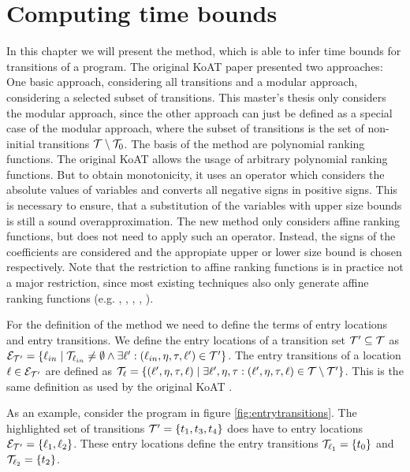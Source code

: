 \section{Computing time bounds}

In this chapter we will present the method, which is able to infer time bounds for transitions of a program.
The original KoAT paper \cite{koat} presented two approaches: One basic approach, considering all transitions and a modular approach, considering a selected subset of transitions.
This master's thesis only considers the modular approach, since the other approach can just be defined as a special case of the modular approach, where the subset of transitions is the set of non-initial transitions $\mathcal{T} \setminus \mathcal{T}_0$.
The basis of the method are polynomial ranking functions.
The original KoAT allows the usage of arbitrary polynomial ranking functions.
But to obtain monotonicity, it uses an operator which considers the absolute values of variables and converts all negative signs in positive signs.
This is necessary to ensure, that a substitution of the variables with upper size bounds is still a sound overapproximation.
The new method only considers affine ranking functions, but does not need to apply such an operator.
Instead, the signs of the coefficients are considered and the appropiate upper or lower size bound is chosen respectively.
Note that the restriction to affine ranking functions is in practice not a major restriction, since most existing techniques also only generate affine ranking functions (e.g. \cite{podelski2004prf}, \cite{bradley2005linear}, \cite{bagnara2012new}, \cite{leike2014ranking}, \cite{ben2013linear}).

For the definition of the method we need to define the terms of entry locations and entry transitions.
We define the entry locations of a transition set $\mathcal{T}' \subseteq \mathcal{T}$ as $\mathcal{E}_{\mathcal{T}'} = \lbrace \ell_{in} \mid \mathcal{T}_{\ell_{in}} \neq \emptyset \wedge \exists \ell': (\ell_{in}, \eta, \tau, \ell') \in \mathcal{T}' \rbrace$.
The entry transitions of a location $\ell \in \mathcal{E}_{\mathcal{T}'}$ are defined as $\mathcal{T}_{\ell} = \lbrace (\ell', \eta, \tau, \ell) \mid \exists \ell', \eta, \tau: (\ell', \eta, \tau, \ell) \in \mathcal{T} \setminus \mathcal{T}' \rbrace$.
This is the same definition as used by the original KoAT \cite{koat}.



As an example, consider the program in figure \ref{fig:entrytransitions}.
The highlighted set of transitions $\mathcal{T}' = \lbrace t_1, t_3, t_4 \rbrace$ does have to entry locations $\mathcal{E}_{\mathcal{T}'} = \lbrace \ell_1, \ell_2 \rbrace$.
These entry locations define the entry transitions $\mathcal{T}_{\ell_1} = \lbrace t_0 \rbrace$ and $\mathcal{T}_{\ell_2} = \lbrace t_2 \rbrace$.

